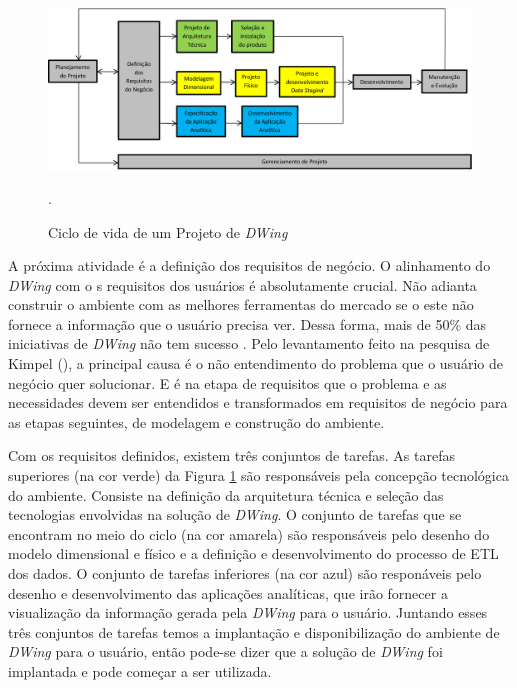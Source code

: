  \begin{figure}[!htb]
 	\centering
 		\includegraphics[scale=0.7]{figuras/dw-ciclo-de-vida}
 		\caption{Ciclo de vida de um Projeto de \emph{DWing} \cite{kimball2002}}.
 		\label{dw-lifecycle}
 \end{figure}

A próxima atividade é a definição dos requisitos de negócio. O alinhamento do \emph{DWing} com o s requisitos dos usuários é absolutamente crucial. Não adianta construir o ambiente com as melhores ferramentas do mercado se o este não fornece a informação que o usuário precisa ver. Dessa forma, mais de 50\% das iniciativas de \emph{DWing} não tem sucesso \cite{sen2011}. Pelo levantamento feito na pesquisa de Kimpel (\citeyear{kimpel2013}), a principal causa é o não entendimento do problema que o usuário de negócio quer solucionar. E é na etapa de requisitos que o problema e as necessidades devem ser entendidos e transformados em requisitos de negócio para as etapas seguintes, de modelagem e construção do ambiente.

%

Com os requisitos definidos, existem três conjuntos de tarefas. As tarefas superiores (na cor verde) da Figura \ref{dw-lifecycle} são responsáveis pela concepção tecnológica do ambiente. Consiste na definição da arquitetura técnica e  seleção das tecnologias envolvidas na solução de \emph{DWing}. O conjunto de tarefas que se encontram no meio do ciclo (na cor amarela) são responsáveis pelo desenho do modelo dimensional e físico e a definição e desenvolvimento do processo de ETL dos dados. O conjunto de tarefas inferiores (na cor  azul) são responáveis pelo desenho e desenvolvimento das aplicações analíticas, que irão fornecer a visualização da informação gerada pela \emph{DWing} para o usuário. Juntando esses três conjuntos de tarefas temos a implantação e disponibilização do ambiente de \emph{DWing} para o usuário, então pode-se dizer que a solução de \emph{DWing} foi implantada e pode começar a ser utilizada. 


